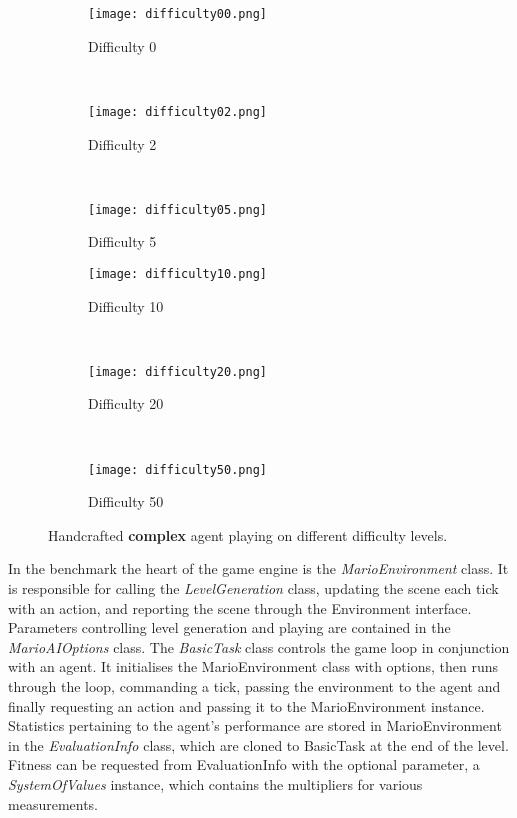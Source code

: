 \begin{figure}[t]
	\begin{adjustwidth}{-2cm}{-2cm}
    \centering
          \begin{subfigure}[b]{0.32\textwidth}
                  \centering
                  \texttt{[image: difficulty00.png]}
                  \caption{Difficulty 0}
          \end{subfigure}~
          \begin{subfigure}[b]{0.32\textwidth}
                  \centering
                  \texttt{[image: difficulty02.png]}
                  \caption{Difficulty 2}
          \end{subfigure}~
          \begin{subfigure}[b]{0.32\textwidth}
                  \centering
                  \texttt{[image: difficulty05.png]}
                  \caption{Difficulty 5}
          \end{subfigure}
          \begin{subfigure}[b]{0.32\textwidth}
                  \centering
                  \texttt{[image: difficulty10.png]}
                  \caption{Difficulty 10}
          \end{subfigure}~
          \begin{subfigure}[b]{0.32\textwidth}
                  \centering
                  \texttt{[image: difficulty20.png]}
                  \caption{Difficulty 20}
          \end{subfigure}~
          \begin{subfigure}[b]{0.32\textwidth}
                  \centering
                  \texttt{[image: difficulty50.png]}
                  \caption{Difficulty 50}
          \end{subfigure}
    \caption{Handcrafted \textbf{complex} agent playing on different difficulty levels.}\label{fig:lpdiff}
    \end{adjustwidth}
\end{figure}

In the benchmark the heart of the game engine is the \emph{MarioEnvironment} class. It is responsible for calling the \emph{LevelGeneration} class, updating the scene each tick with an action, and reporting the scene through the Environment interface. Parameters controlling level generation and playing are contained in the \emph{MarioAIOptions} class.  The \emph{BasicTask} class controls the game loop in conjunction with an agent. It initialises the MarioEnvironment class with options, then runs through the loop, commanding a tick, passing the environment to the agent and finally requesting an action and passing it to the MarioEnvironment instance. Statistics pertaining to the agent's performance are stored in MarioEnvironment in the \emph{EvaluationInfo} class, which are cloned to BasicTask at the end of the level. Fitness can be requested from EvaluationInfo with the optional parameter, a \emph{SystemOfValues} instance, which contains the multipliers for various measurements.

